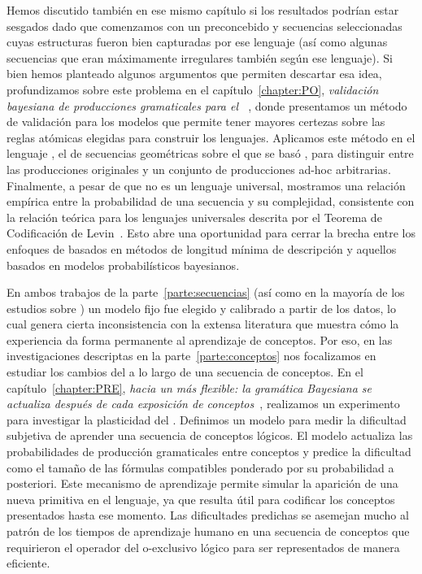 Hemos discutido también en ese mismo capítulo si los resultados podrían estar sesgados dado que comenzamos con un \lot preconcebido y secuencias seleccionadas cuyas estructuras fueron bien capturadas por ese lenguaje (así como algunas secuencias que eran máximamente irregulares también según ese lenguaje). Si bien hemos planteado algunos argumentos que permiten descartar esa idea, profundizamos sobre este problema en el capítulo~\ref{chapter:PO}, \textit{validación bayesiana de producciones gramaticales para el \lot~\cite{romano2018bayesian}}, donde presentamos un método de validación para los modelos \lot que permite tener mayores certezas sobre las reglas atómicas elegidas para construir los lenguajes. Aplicamos este método en el lenguaje \gramgeo, el \lot de secuencias geométricas sobre el que se basó \grambin, para distinguir entre las producciones originales y un conjunto de producciones ad-hoc arbitrarias. Finalmente, a pesar de que \gramgeo no es un lenguaje universal, mostramos una relación empírica entre la probabilidad de una secuencia y su complejidad, consistente con la relación teórica para los lenguajes universales descrita por el Teorema de Codificación de Levin~\cite{levin1974laws}. Esto abre una oportunidad para cerrar la brecha entre los enfoques de \lot basados en métodos de longitud mínima de descripción y aquellos basados en modelos probabilísticos bayesianos.

En ambos trabajos de la parte~\ref{parte:secuencias} (así como en la mayoría de los estudios sobre \lot) un modelo fijo fue elegido y calibrado a partir de los datos, lo cual genera cierta inconsistencia con la extensa literatura que muestra cómo la experiencia da forma permanente al aprendizaje de conceptos. Por eso, en las investigaciones descriptas en la parte~\ref{parte:conceptos} nos focalizamos en estudiar los cambios del \lot a lo largo de una secuencia de conceptos. En el capítulo~\ref{chapter:PRE}, \textit{hacia un \lot más flexible: la gramática Bayesiana se actualiza después de cada exposición de conceptos~\cite{tano2020towards}}, realizamos un experimento para investigar la plasticidad del \lot. Definimos un modelo para medir la dificultad subjetiva de aprender una secuencia de conceptos lógicos. El modelo actualiza las probabilidades de producción gramaticales entre conceptos y predice la dificultad como el tamaño de las fórmulas compatibles ponderado por su probabilidad a posteriori. Este mecanismo de aprendizaje permite simular la aparición de una nueva primitiva en el lenguaje, ya que resulta útil para codificar los conceptos presentados hasta ese momento. Las dificultades predichas se asemejan mucho al patrón de los tiempos de aprendizaje humano en una secuencia de conceptos que requirieron el operador del o-exclusivo lógico para ser representados de manera eficiente.

